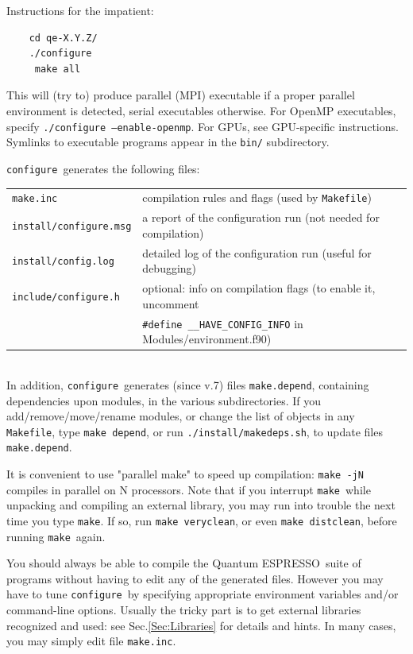 \documentclass[12pt,a4paper]{article}
\def\qe{{\sc Quantum ESPRESSO}}
\def\configure{\texttt{configure}}
\def\make{\texttt{make}}
\begin{document}
Instructions for the impatient:
\begin{verbatim}
    cd qe-X.Y.Z/
    ./configure
     make all
\end{verbatim}
This will (try to) produce parallel (MPI) executable if a proper parallel
environment is detected, serial executables otherwise. For OpenMP executables,
specify \texttt{./configure --enable-openmp}. For  GPUs, see GPU-specific
instructions. Symlinks to executable programs appear in the \texttt{bin/} 
subdirectory.

\noindent \configure\ generates the following files:

\begin{tabular}{ll}
\texttt{make.inc} &      compilation rules and flags (used by \texttt{Makefile})\\
\texttt{install/configure.msg} & a report of the configuration run (not needed for compilation)\\
\texttt{install/config.log} & detailed log of the configuration run (useful for debugging)\\
\texttt{include/configure.h} &  optional: info on compilation flags
	(to enable it, uncomment \\ &
	\verb|#define __HAVE_CONFIG_INFO|
	 in Modules/environment.f90)\\
\end{tabular}\\
In addition, \configure\ generates (since v.7) files \texttt{make.depend},
containing dependencies upon modules, in the various subdirectories.
If you add/remove/move/rename modules, or change the list of objects
in any \texttt{Makefile}, type \texttt{make depend}, or run 
\texttt{./install/makedeps.sh}, to update files \texttt{make.depend}.

It is convenient to use "parallel make" to speed up compilation:
\texttt{make -jN} compiles in parallel on N processors. Note that
if you interrupt \make\ while unpacking and compiling an external 
library, you may run into trouble the next time you type \make. 
If so, run \texttt{make veryclean}, or even \texttt{make distclean}, 
before running \make\ again.

You should always be able to compile the \qe\ suite
of programs without having to edit any of the generated files. However you
may have to tune \configure\ by specifying appropriate environment variables
and/or command-line options. Usually the tricky part is to get external
libraries recognized and used: see Sec.\ref{Sec:Libraries}
for details and hints. In many cases, you may simply edit file
\texttt{make.inc}. 
\end{document}
